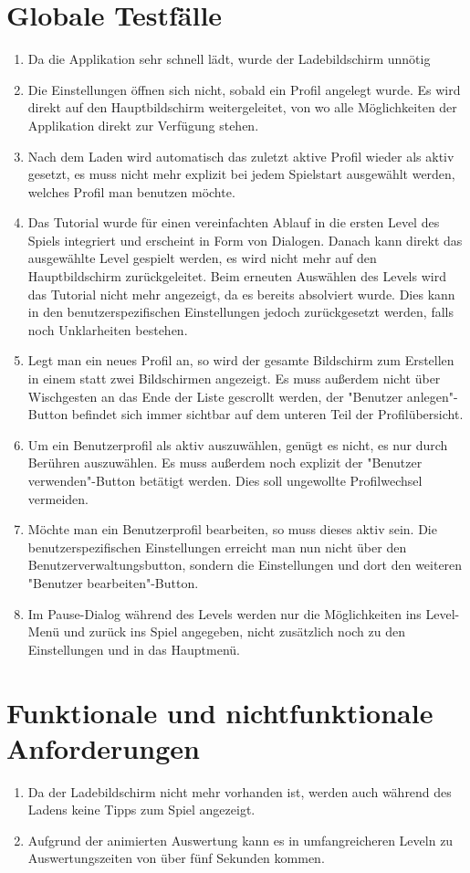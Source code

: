 \documentclass[parskip=full]{scrreprt}
\begin{document}
\section{Globale Testfälle}
\begin{enumerate}
	\item Da die Applikation sehr schnell lädt, wurde der Ladebildschirm unnötig
	\item Die Einstellungen öffnen sich nicht, sobald ein Profil angelegt wurde. Es wird direkt auf den Hauptbildschirm weitergeleitet, von wo alle Möglichkeiten der Applikation direkt zur Verfügung stehen.
	\item Nach dem Laden wird automatisch das zuletzt aktive Profil wieder als aktiv gesetzt, es muss nicht mehr explizit bei jedem Spielstart ausgewählt werden, welches Profil man benutzen möchte.
	\item Das Tutorial wurde für einen vereinfachten Ablauf in die ersten Level des Spiels integriert und erscheint in Form von Dialogen. Danach kann direkt das ausgewählte Level gespielt werden, es wird nicht mehr auf den Hauptbildschirm zurückgeleitet. Beim erneuten Auswählen des Levels wird das Tutorial nicht mehr angezeigt, da es bereits absolviert wurde. Dies kann in den benutzerspezifischen Einstellungen jedoch zurückgesetzt werden, falls noch Unklarheiten bestehen.
	\item Legt man ein neues Profil an, so wird der gesamte Bildschirm zum Erstellen in einem statt zwei Bildschirmen angezeigt. Es muss außerdem nicht über Wischgesten an das Ende der Liste gescrollt werden, der "Benutzer anlegen"-Button befindet sich immer sichtbar auf dem unteren Teil der Profilübersicht.
	\item Um ein Benutzerprofil als aktiv auszuwählen, genügt es nicht, es nur durch Berühren auszuwählen. Es muss außerdem noch explizit der "Benutzer verwenden"-Button betätigt werden. Dies soll ungewollte Profilwechsel vermeiden.
	\item Möchte man ein Benutzerprofil bearbeiten, so muss dieses aktiv sein. Die benutzerspezifischen Einstellungen erreicht man nun nicht über den Benutzerverwaltungsbutton, sondern die Einstellungen und dort den weiteren "Benutzer bearbeiten"-Button.
	\item Im Pause-Dialog während des Levels werden nur die Möglichkeiten ins Level-Menü und zurück ins Spiel angegeben, nicht zusätzlich noch zu den Einstellungen und in das Hauptmenü.
\end{enumerate}

\section{Funktionale und nichtfunktionale Anforderungen}
\begin{enumerate}[resume]
	\item Da der Ladebildschirm nicht mehr vorhanden ist, werden auch während des Ladens keine Tipps zum Spiel angezeigt.
	\item Aufgrund der animierten Auswertung kann es in umfangreicheren Leveln zu Auswertungszeiten von über fünf Sekunden kommen.
\end{enumerate}
\end{document}
